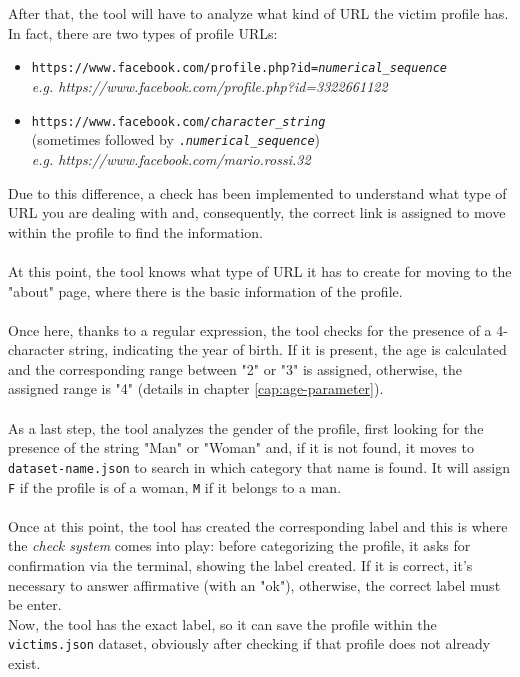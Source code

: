 \\\\After that, the tool will have to analyze what kind of URL the victim profile has. In fact, there are two types of profile URLs:
\begin{itemize}
	\item \texttt{https://www.facebook.com/profile.php?id=\textit{numerical\_sequence}}\\\textit{e.g. https://www.facebook.com/profile.php?id=3322661122}
	
	\item \texttt{https://www.facebook.com/\textit{character\_string}}\\(sometimes followed by \texttt{.\textit{numerical\_sequence}})\\\textit{e.g. https://www.facebook.com/mario.rossi.32}
\end{itemize}
Due to this difference, a check has been implemented to understand what type of URL you are dealing with and, consequently, the correct link is assigned to move within the profile to find the information.
\\\\At this point, the tool knows what type of URL it has to create for moving to the "about" page, where there is the basic information of the profile. 
\\\\Once here, thanks to a regular expression, the tool checks for the presence of a 4-character string, indicating the year of birth. If it is present, the age is calculated and the corresponding range between "2" or "3" is assigned, otherwise, the assigned range is "4" (details in chapter \ref{cap:age-parameter}).
\\\\As a last step, the tool analyzes the gender of the profile, first looking for the presence of the string "Man" or "Woman" and, if it is not found, it moves to \texttt{dataset-name.json} to search in which category that name is found. It will assign \texttt{F} if the profile is of a woman, \texttt{M} if it belongs to a man.
\\\\
Once at this point, the tool has created the corresponding label and this is where the \textit{check system} comes into play: before categorizing the profile, it asks for confirmation via the terminal, showing the label created. If it is correct, it's necessary to answer affirmative (with an "ok"), otherwise, the correct label must be enter.
\\Now, the tool has the exact label, so it can save the profile within the \texttt{victims.json} dataset, obviously after checking if that profile does not already exist.

